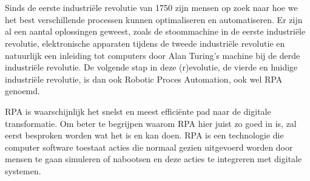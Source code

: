 
\chapter{}
\label{ch:inleiding}



Sinds de eerste industriële revolutie van 1750 zijn mensen op zoek naar hoe we het best verschillende processen kunnen optimaliseren en automatiseren. Er zijn al een aantal oplossingen geweest, zoals de stoommachine in de eerste industriële revolutie, elektronische apparaten tijdens de tweede industriële revolutie en natuurlijk een inleiding tot computers door Alan Turing's machine bij de derde industriële revolutie. De volgende stap in deze (r)evolutie, de vierde en huidige industriële revolutie, is dan ook Robotic Proces Automation, ook wel RPA genoemd. \autocite{indusRev}

RPA is waarschijnlijk het snelst en meest efficiënte pad naar de digitale transformatie. Om beter te begrijpen waarom RPA hier juist zo goed in is, zal eerst besproken worden wat het is en kan doen. RPA is een technologie die computer software toestaat acties die normaal gezien uitgevoerd worden door mensen te gaan simuleren of nabootsen en deze acties te integreren met digitale systemen.

